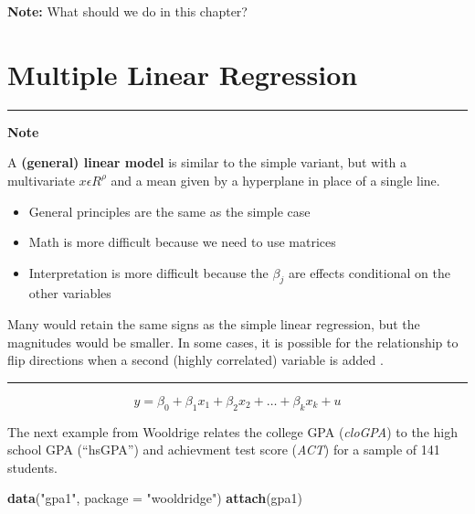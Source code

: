 \documentclass[]{book}
\newenvironment{Shaded}{\begin{snugshade}}{\end{snugshade}}
\newcommand{\DataTypeTok}[1]{\textcolor[rgb]{0.13,0.29,0.53}{#1}}
\newcommand{\KeywordTok}[1]{\textcolor[rgb]{0.13,0.29,0.53}{\textbf{#1}}}
\newcommand{\NormalTok}[1]{#1}
\newcommand{\StringTok}[1]{\textcolor[rgb]{0.31,0.60,0.02}{#1}}
\providecommand{\tightlist}{%
  \setlength{\itemsep}{0pt}\setlength{\parskip}{0pt}}
\begin{document}
\textbf{Note:} What should we do in this chapter?

\hypertarget{multiple-linear-regression}{%
\section{Multiple Linear Regression}\label{multiple-linear-regression}}

\begin{center}\rule{0.5\linewidth}{\linethickness}\end{center}

\textbf{Note}

A \textbf{(general) linear model} is similar to the simple variant, but
with a multivariate \(x \epsilon \!R^{\rho}\) and a mean given by a
hyperplane in place of a single line.

\begin{itemize}
\tightlist
\item
  General principles are the same as the simple case
\item
  Math is more difficult because we need to use matrices
\item
  Interpretation is more difficult because the \(\beta_{j}\) are effects
  conditional on the other variables
\end{itemize}

Many would retain the same signs as the simple linear regression, but
the magnitudes would be smaller. In some cases, it is possible for the
relationship to flip directions when a second (highly correlated)
variable is added \citet{dalpiaz2016}.

\begin{center}\rule{0.5\linewidth}{\linethickness}\end{center}

\begin{equation}
y = \beta_{0} + \beta_{1}x_{1} +  \beta_{2}x_{2} + \dots + \beta_{k}x_{k} + u   
\label{eq:multipleregression}
\end{equation}

The next example from Wooldrige relates the college GPA (\emph{cloGPA})
to the high school GPA (``hsGPA'') and achievment test score
(\emph{ACT}) for a sample of 141 students.

\begin{Shaded}
\begin{Highlighting}[]
\KeywordTok{data}\NormalTok{(}\StringTok{"gpa1"}\NormalTok{, }\DataTypeTok{package =} \StringTok{"wooldridge"}\NormalTok{)}
\KeywordTok{attach}\NormalTok{(gpa1)}
\end{Highlighting}
\end{Shaded}
\end{document}
